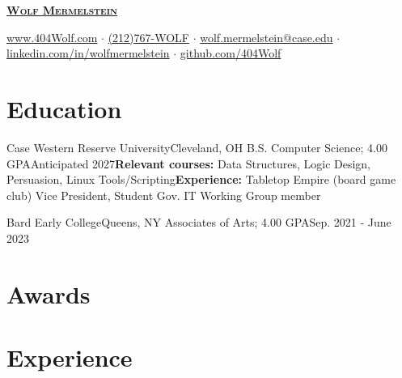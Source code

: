 \documentclass[letterpaper, 10pt]{article}
\begin{document}
	
	
	\begin{center}
		\textbf{\Huge \scshape \href{https://404wolf.com}{Wolf Mermelstein}} \\ \vspace{12pt}
		
		\href{https://404wolf.com}{www.404Wolf.com}
		$\cdot$
		\small \href{tel:(+12127679653)}{(212)767-WOLF}
		$\cdot$
		\href{mailto:wolf.mermelstein@case.edu}{wolf.mermelstein@case.edu}
		$\cdot$
		\href{https://linkedin.com/in/wolfmermelstein}{linkedin.com/in/wolfmermelstein}
		$\cdot$
		\href{https://github.com/404wolf}{github.com/404Wolf}
	\end{center}
	\vspace{-12px}
	
	\section{Education}
	\resumeSubHeadingListStart
	
	\twoLineResumeSubheading
	{Case Western Reserve University}{Cleveland, OH}{}
	{B.S. Computer Science; 4.00 GPA}{Anticipated 2027}{\textbf{Relevant courses:} Data Structures, Logic Design, Persuasion, Linux Tools/Scripting}{\textbf{Experience:} Tabletop Empire (board game club) Vice President, Student Gov. IT Working Group member}
	
	\resumeSubheading
	{Bard Early College}{Queens, NY}{}
	{Associates of Arts;  4.00 GPA}{Sep. 2021 - June 2023}{}
	\resumeSubHeadingListEnd
	
	\section{Awards}
	\resumeSubHeadingListStart
	
	
		
	\resumeSubHeadingListEnd
	
	\section{Experience}
	\resumeSubHeadingListStart
	
\end{document}
